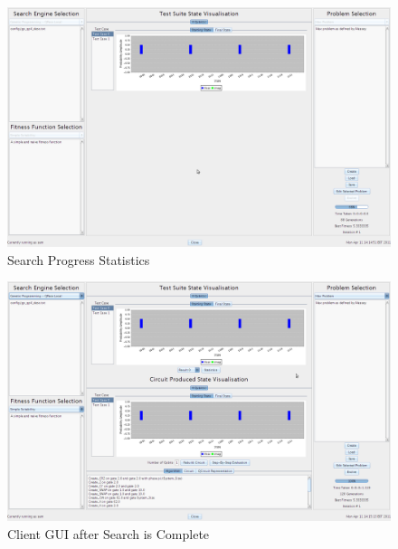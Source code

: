 \begin{figure}
  \includegraphics[width=\textwidth]{walkthrough8.png}
 \caption{Search Progress Statistics}
 \label{fig:walkthrough8}
\end{figure}

\begin{figure}
  \includegraphics[width=\textwidth]{walkthrough9.png}
 \caption{Client GUI after Search is Complete}
 \label{fig:walkthrough9}
\end{figure}
